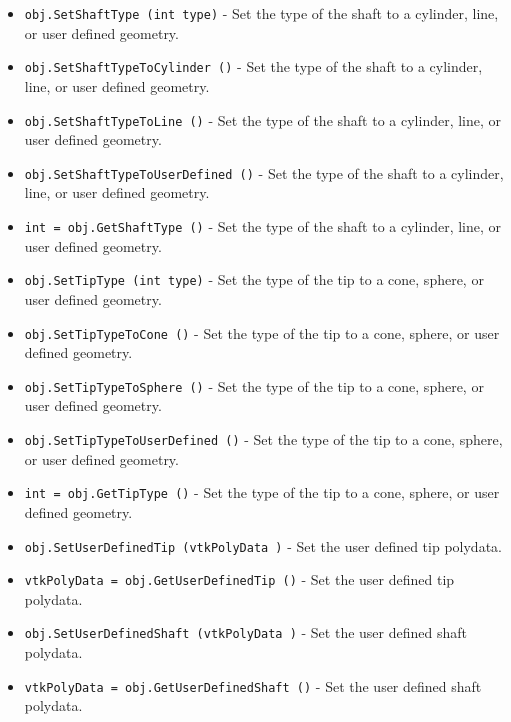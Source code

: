 \begin{itemize}
\item  \verb|obj.SetShaftType (int type)| -  Set the type of the shaft to a cylinder, line, or user defined geometry.

\item  \verb|obj.SetShaftTypeToCylinder ()| -  Set the type of the shaft to a cylinder, line, or user defined geometry.

\item  \verb|obj.SetShaftTypeToLine ()| -  Set the type of the shaft to a cylinder, line, or user defined geometry.

\item  \verb|obj.SetShaftTypeToUserDefined ()| -  Set the type of the shaft to a cylinder, line, or user defined geometry.

\item  \verb|int = obj.GetShaftType ()| -  Set the type of the shaft to a cylinder, line, or user defined geometry.

\item  \verb|obj.SetTipType (int type)| -  Set the type of the tip to a cone, sphere, or user defined geometry.

\item  \verb|obj.SetTipTypeToCone ()| -  Set the type of the tip to a cone, sphere, or user defined geometry.

\item  \verb|obj.SetTipTypeToSphere ()| -  Set the type of the tip to a cone, sphere, or user defined geometry.

\item  \verb|obj.SetTipTypeToUserDefined ()| -  Set the type of the tip to a cone, sphere, or user defined geometry.

\item  \verb|int = obj.GetTipType ()| -  Set the type of the tip to a cone, sphere, or user defined geometry.

\item  \verb|obj.SetUserDefinedTip (vtkPolyData )| -  Set the user defined tip polydata.

\item  \verb|vtkPolyData = obj.GetUserDefinedTip ()| -  Set the user defined tip polydata.

\item  \verb|obj.SetUserDefinedShaft (vtkPolyData )| -  Set the user defined shaft polydata.

\item  \verb|vtkPolyData = obj.GetUserDefinedShaft ()| -  Set the user defined shaft polydata.


\end{itemize}
